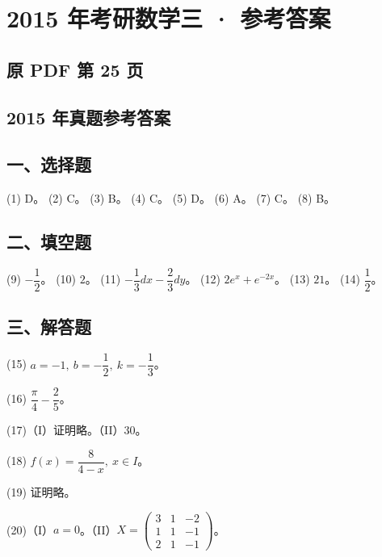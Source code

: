 \documentclass[UTF8,12pt]{ctexart}
\begin{document}
\section*{2015 年考研数学三 · 参考答案}
\subsection*{原 PDF 第 25 页}

\subsection*{2015 年真题参考答案}

\subsection*{一、选择题}

(1) D。 (2) C。 (3) B。 (4) C。 (5) D。 (6) A。 (7) C。 (8) B。


\subsection*{二、填空题}

(9) \(\displaystyle -\dfrac{\displaystyle 1}{\displaystyle 2}\)。 (10) \(\displaystyle 2\)。 (11) \(\displaystyle -\dfrac{\displaystyle 1}{\displaystyle 3}dx-\dfrac{\displaystyle 2}{\displaystyle 3}dy\)。 (12) \(\displaystyle 2e^x+e^{-2x}\)。 (13) \(\displaystyle 21\)。 (14) \(\displaystyle \dfrac{\displaystyle 1}{\displaystyle 2}\)。


\subsection*{三、解答题}

(15) \(\displaystyle a=-1,\allowbreak \ b=-\dfrac{\displaystyle 1}{\displaystyle 2},\allowbreak \ k=-\dfrac{\displaystyle 1}{\displaystyle 3}\)。


(16) \(\displaystyle \dfrac{\displaystyle \pi}{\displaystyle 4}-\dfrac{\displaystyle 2}{\displaystyle 5}\)。


(17)（I）证明略。（II）\(\displaystyle 30\)。


(18) \(\displaystyle f(x)=\dfrac{\displaystyle 8}{\displaystyle 4-x},\allowbreak \ x\in I\)。


(19) 证明略。


(20)（I）\(\displaystyle a=0\)。（II）\(\displaystyle X=\begin{pmatrix}3&1&-2\\1&1&-1\\2&1&-1\end{pmatrix}\)。
\end{document}
